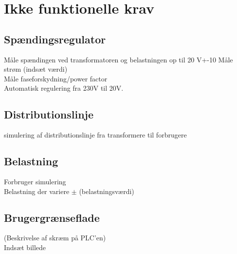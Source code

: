 
\section{Ikke funktionelle krav}

\subsection{Spændingsregulator}

Måle spændingen ved transformatoren og belastningen op til 20 V+-10%
Måle strøm (indsæt værdi) \\
Måle faseforskydning/power factor \\
Automatisk regulering fra 230V til 20V. \\


\subsection{Distributionslinje}
simulering af distributionslinje fra transformere til forbrugere  \\


\subsection{Belastning}
Forbruger simulering \\
Belastning der variere $\pm$ (belastningsværdi)\\



\subsection{Brugergrænseflade}
(Beskrivelse af skræm på PLC’en) \\
Indsæt billede \\

